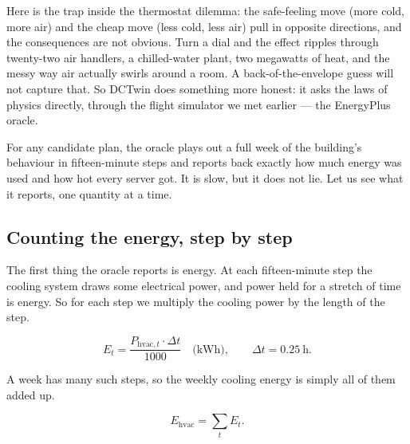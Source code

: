 Here is the trap inside the thermostat dilemma: the safe-feeling move (more cold, more air) and the cheap move (less cold, less air) pull in opposite directions, and the consequences are not obvious. Turn a dial and the effect ripples through twenty-two air handlers, a chilled-water plant, two megawatts of heat, and the messy way air actually swirls around a room. A back-of-the-envelope guess will not capture that. So DCTwin does something more honest: it asks the laws of physics directly, through the flight simulator we met earlier --- the EnergyPlus oracle.

For any candidate plan, the oracle plays out a full week of the building's behaviour in fifteen-minute steps and reports back exactly how much energy was used and how hot every server got. It is slow, but it does not lie. Let us see what it reports, one quantity at a time.

\subsection*{Counting the energy, step by step}

The first thing the oracle reports is energy. At each fifteen-minute step the cooling system draws some electrical power, and power held for a stretch of time is energy. So for each step we multiply the cooling power by the length of the step.

\begin{equation}\label{eq:energy-step}
E_t = \frac{P_{\text{hvac},t} \cdot \Delta t}{1000} \quad \text{(kWh)}, \qquad \Delta t = 0.25\ \text{h}.
\end{equation}

A week has many such steps, so the weekly cooling energy is simply all of them added up.

\begin{equation}\label{eq:energy-week}
E_{\text{hvac}} = \sum_{t} E_t.
\end{equation}

